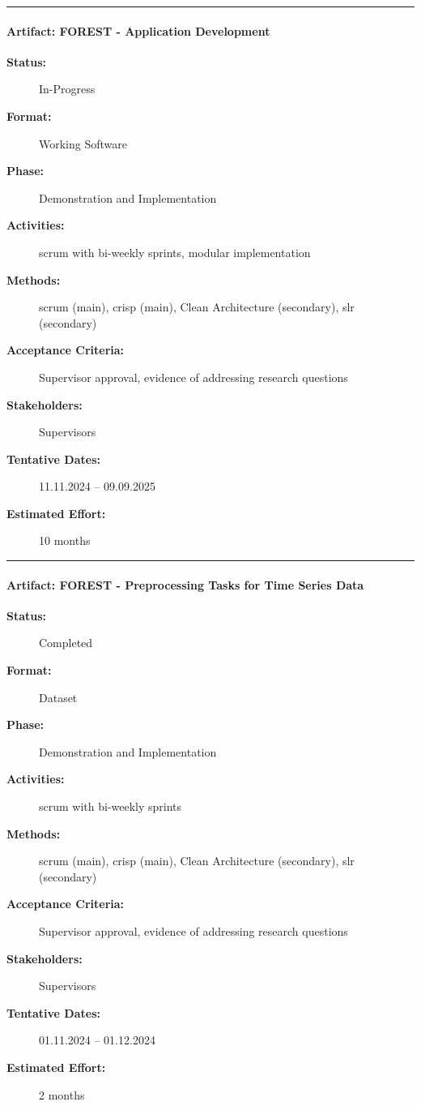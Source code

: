 \noindent\rule{13cm}{0.3pt}

\paragraph{Artifact: FOREST - Application Development}
\begin{description}
  \item[\textbf{Status:}] In-Progress
  \item[\textbf{Format:}] Working Software
  \item[\textbf{Phase:}] Demonstration and Implementation
  \item[\textbf{Activities:}] \acrshort{scrum} with bi-weekly sprints, modular implementation
  \item[\textbf{Methods:}] \acrshort{scrum} (main), \acrshort{crisp} (main), Clean Architecture (secondary), \acrshort{slr} (secondary)
  \item[\textbf{Acceptance Criteria:}] Supervisor approval, evidence of addressing research questions
  \item[\textbf{Stakeholders:}] Supervisors
  \item[\textbf{Tentative Dates:}] 11.11.2024 – 09.09.2025
  \item[\textbf{Estimated Effort:}] 10 months
\end{description}

\noindent\rule{13cm}{0.3pt}

\paragraph{Artifact: FOREST - Preprocessing Tasks for Time Series Data}
\begin{description}
  \item[\textbf{Status:}] Completed
  \item[\textbf{Format:}] Dataset
  \item[\textbf{Phase:}] Demonstration and Implementation
  \item[\textbf{Activities:}] \acrshort{scrum} with bi-weekly sprints
  \item[\textbf{Methods:}] \acrshort{scrum} (main), \acrshort{crisp} (main), Clean Architecture (secondary), \acrshort{slr} (secondary)
  \item[\textbf{Acceptance Criteria:}] Supervisor approval, evidence of addressing research questions
  \item[\textbf{Stakeholders:}] Supervisors
  \item[\textbf{Tentative Dates:}] 01.11.2024 – 01.12.2024
  \item[\textbf{Estimated Effort:}] 2 months
\end{description}

